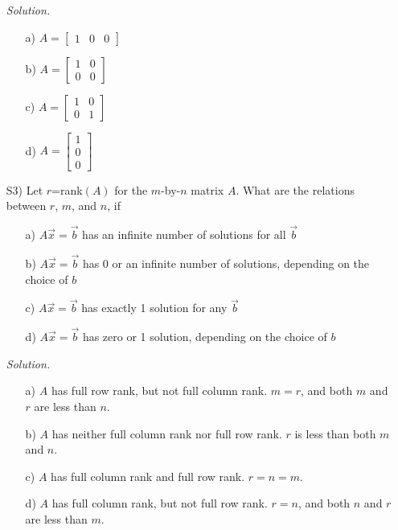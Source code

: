 \documentclass[12pt]{article}
\begin{document}
\begin{itemize}
\textit{Solution.}
\begin{itemize}
\item[a)] $A=\left[\begin{array}{ccc} 1 & 0 & 0 \end{array}\right]$
\item[b)] $A=\left[\begin{array}{cc} 1 & 0 \\ 0 & 0 \end{array}\right]$
\item[c)] $A=\left[\begin{array}{cc} 1 & 0 \\ 0 & 1 \end{array}\right]$
\item[d)] $A=\left[\begin{array}{c} 1 \\ 0 \\ 0 \end{array}\right]$
\end{itemize}

\item[S3)] Let $r$=rank$(A)$ for the $m$-by-$n$ matrix $A$.  What are the relations between $r$, $m$, and $n$, if
\begin{itemize}
\item[a)] $A\vec{x}=\vec{b}$ has an infinite number of solutions for all $\vec{b}$
\item[b)] $A\vec{x}=\vec{b}$ has 0 or an infinite number of solutions, depending on the choice of $b$
\item[c)] $A\vec{x}=\vec{b}$ has exactly 1 solution for any $\vec{b}$
\item[d)] $A\vec{x}=\vec{b}$ has zero or 1 solution, depending on the choice of $b$ 
\end{itemize}

\textit{Solution.}
\begin{itemize}
\item[a)] $A$ has full row rank, but not full column rank. $m=r$, and both $m$ and $r$ are less than $n$.
\item[b)] $A$ has neither full column rank nor full row rank. $r$ is less than both $m$ and $n$.
\item[c)] $A$ has full column rank and full row rank. $r=n=m$.
\item[d)] $A$ has full column rank, but not full row rank. $r=n$, and both $n$ and $r$ are less than $m$.
\end{itemize}

\end{itemize}
\end{document}
